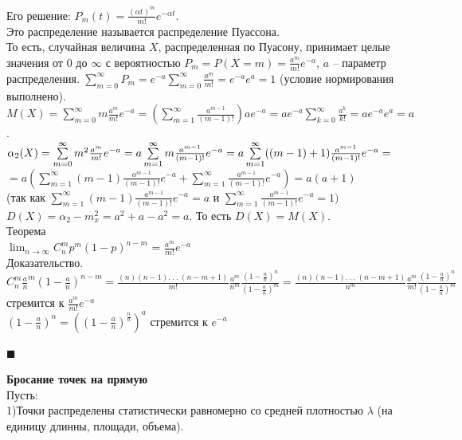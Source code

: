 \documentclass[russian, 12pt, fleqn]{article}
\begin{document}
Его решение: $P_m(t) = \frac{(\alpha t)^m}{m!} e^{-\alpha t}$.\\
Это распределение называется распределение Пуассона.\\
То есть, случайная величина $X$, распределенная по Пуасону, принимает целые значения от $0$ до $\infty$ с вероятностью $P_m=P(X=m) = \frac{a^m}{m!}e^{-a}$, $a$ -- параметр распределения. $\sum\limits_{m=0}^{\infty}P_m = e^{-a}\sum\limits_{m=0}^{\infty} \frac{a^m}{m!}  = e^{-a}e^a = 1$  (условие нормирования выполнено).
$M(X) = \sum\limits_{m=0}^{\infty} m\frac{a^m}{m!}e^{-a} = (\sum\limits_{m=1}^{\infty} \frac{a^{m-1}}{(m-1)!})ae^{-a} = ae^{-a}\sum\limits_{k=0}^{\infty} \frac{a^k}{k!} = ae^{-a}e^{a} = a$.\\
$\alpha_2(X) = \sum\limits_{m=0}^{\infty} m^2\frac{a^m}{m!}e^{-a} = a\sum\limits_{m=1}^{\infty} m\frac{a^{m-1}}{(m-1)!}e^{-a} = a \sum\limits_{m=1}^{\infty} ((m-1)+1)\frac{a^{m-1}}{(m-1)!}e^{-a} =\\$ $\displaystyle{ = a \left (\sum\limits_{m=1}^{\infty}(m-1)\frac{a^{m-1}}{(m-1)!}e^{-a} + \sum\limits_{m=1}^{\infty}\frac{a^{m-1}}{(m-1)!}e^{-a} \right )=a(a+1)}$\\
(так как  $\sum\limits_{m=1}^{\infty}(m-1)\frac{a^{m-1}}{(m-1)!}e^{-a} = a$ и $ \sum\limits_{m=1}^{\infty}\frac{a^{m-1}}{(m-1)!}e^{-a}  = 1)$\\
$D(X) = \alpha_2 - m_x^2 = a^2 + a - a^2 = a$. То есть $D(X)=M(X)$.\\
$\textbf{Теорема}$\\
$\displaystyle{\lim_{n \to {\infty}}  C^m_np^m(1-p)^{n-m}}$ = $\frac{a^m}{m!}e^{-a}$\\
Доказательство.\\
$C^m_n\frac{a}{n}^m(1-\frac{a}{n})^{n-m} = \frac{(n)(n-1).\ .\ .\ (n-m+1)}{m!} \frac{a^m}{n^m} \frac{(1-\frac{a}{n})^n}{(1-\frac{a}{n})^m} = 
\frac{(n)(n-1).\ .\ .\ (n-m+1)}{n^m}  \frac{a^m}{m!} \frac{(1-\frac{a}{n})^n}{(1-\frac{a}{n})^m}$  \\стремится к $\frac{a^m}{m!} e^{-a}$\\
$(1-\frac{a}{n})^n = ((1-\frac{a}{n})^\frac{n}{a})^a$ стремится к $e^{-a}$\\
\begin{flushright}\(\blacksquare\)\end{flushright}
\textbf{Бросание точек на прямую}\\
Пусть: \\
1)Точки распределены статистически равномерно со средней плотностью $\lambda$ (на единицу длинны, площади, объема).\\
\end{document}
